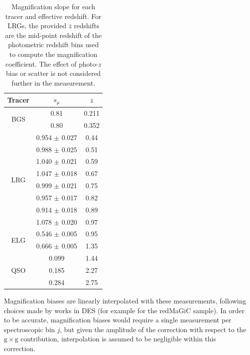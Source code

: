 \begin{table}[h]
\centering
\caption{Magnification slope for each tracer and effective redshift. For LRGs, the provided $\bar{z}$ redshifts are the mid-point redshift of the photometric redshift bins used to compute the magnification coefficient. The effect of photo-$z$ bias or scatter is not considered further in the measurement.}
\begin{tabular}{c|c|c}
\hline
\textbf{Tracer} & $s_\mu$ & $\bar{z}$ \\
\hline
\multirow{2}{*}{BGS \cite{Sailer2025EvolutionStructureMagnificationBiasBGS}} & 0.81 & 0.211 \\
                    & 0.80 & 0.352 \\
\hline
\multirow{8}{*}{LRG \cite{DESI.LRGCross.Magnifcation.Zhou2023}} 
& 0.954 $\pm$ 0.027 & 0.44 \\
& 0.988 $\pm$ 0.025 & 0.51 \\
& 1.040 $\pm$ 0.021 & 0.59 \\
& 1.047 $\pm$ 0.018 & 0.67 \\
& 0.999 $\pm$ 0.021 & 0.75 \\
& 0.957 $\pm$ 0.017 & 0.82 \\
& 0.914 $\pm$ 0.018 & 0.89 \\
& 1.078 $\pm$ 0.020 & 0.97 \\
\hline 
\multirow{2}{*}{ELG} & 0.546 $\pm$ 0.005 & 0.95 \\
                    & 0.666 $\pm$ 0.005 & 1.35 \\
\hline
\multirow{3}{*}{QSO \cite{debelsunce2025QSOmagCMBLensing}} & 0.099 & 1.44 \\
                    & 0.185 & 2.27 \\
                    & 0.284 & 2.75 \\
\end{tabular}
\label{tab:mag_bias:desi}
\end{table}

Magnification biases are linearly interpolated with these measurements, following choices made by works in DES \cite{Gatti2021ClusteringDESWLsrcDistrib} (for example for the redMaGiC sample). In order to be accurate, magnification biases would require a single measurement per spectroscopic bin $j$, but given the amplitude of the correction with respect to the $\mathrm{g}\times \mathrm{g}$ contribution, interpolation is assumed to be negligible within this correction.